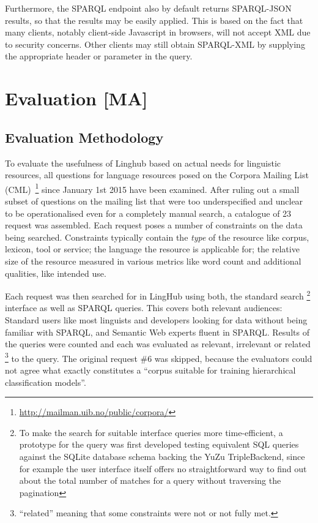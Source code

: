 \documentclass[smallextended]{svjour3}       %
\begin{document}
Furthermore, the SPARQL endpoint also by default returns SPARQL-JSON
results\cite{seaborne2013sparql}, so that the results may be easily applied. This is based on the
fact that many clients, notably client-side Javascript in browsers, will not
accept XML due to security concerns. Other clients may still obtain SPARQL-XML
by supplying the appropriate header or parameter in the query.

\section{Evaluation [MA]}
\label{evaluation}

\subsection{Evaluation Methodology}

To evaluate the usefulness of Linghub based on actual needs for linguistic 
resources, all questions for language resources posed on the Corpora Mailing 
List (CML)~\footnote{\url{http://mailman.uib.no/public/corpora/}} since January
1st 2015 have been examined. After ruling out a small subset of questions on the
mailing list that were too underspecified and unclear to be operationalised even
for a completely manual search, a catalogue of 23 request was assembled. Each
request poses a number of constraints on the data being searched. Constraints
typically contain the \emph{type} of the resource like corpus, lexicon, tool or
service; the language the resource is applicable for; the relative size of the
resource measured in various metrics like word count and additional qualities,
like intended use.  

Each request was then searched for in LingHub using both, the standard search
\footnote{To make the search for suitable interface queries more time-efficient,
    a prototype for the query was first developed testing equivalent SQL queries
    against the SQLite database schema backing the YuZu TripleBackend, since for
    example the user interface itself offers no straightforward way to find out
    about the total number of matches for a query without traversing the
pagination}
interface as well as SPARQL queries. This covers both relevant audiences:
Standard users like most linguists and developers looking for data without being
familiar with SPARQL, and Semantic Web experts fluent in SPARQL. Results of the
queries were counted and each was evaluated as relevant, irrelevant or related
\footnote{``related'' meaning that some constraints were not or not fully met.}
to the query. The original request \#6 was skipped, because the evaluators could
not agree what exactly constitutes a ``corpus suitable for training hierarchical
classification models''. 
\end{document}
